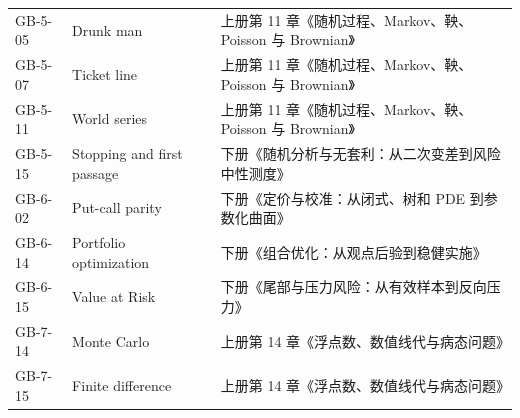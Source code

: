 \begin{longtable}{p{}p{}p{}}
GB-5-05 & Drunk man & 上册第 11 章《随机过程、Markov、鞅、Poisson 与 Brownian》 \\
GB-5-07 & Ticket line & 上册第 11 章《随机过程、Markov、鞅、Poisson 与 Brownian》 \\
GB-5-11 & World series & 上册第 11 章《随机过程、Markov、鞅、Poisson 与 Brownian》 \\
GB-5-15 & Stopping and first passage & 下册《随机分析与无套利：从二次变差到风险中性测度》 \\
GB-6-02 & Put-call parity & 下册《定价与校准：从闭式、树和 PDE 到参数化曲面》 \\
GB-6-14 & Portfolio optimization & 下册《组合优化：从观点后验到稳健实施》 \\
GB-6-15 & Value at Risk & 下册《尾部与压力风险：从有效样本到反向压力》 \\
GB-7-14 & Monte Carlo & 上册第 14 章《浮点数、数值线代与病态问题》 \\
GB-7-15 & Finite difference & 上册第 14 章《浮点数、数值线代与病态问题》 \\
\end{longtable}
